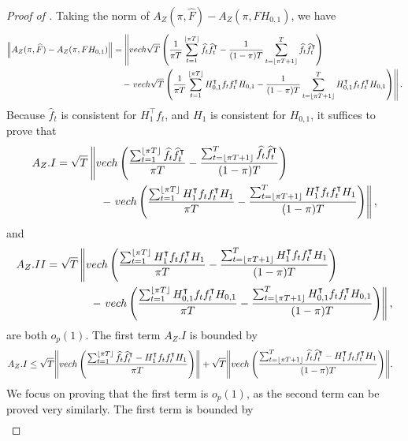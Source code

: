 \documentclass[12pt]{article}
\newcommand*{\tran}{\intercal}
\theoremstyle{plain}
\numberwithin{equation}{section}
\begin{document}
\begin{proof}[Proof of ]
Taking the norm of $A_Z(\pi, \widehat{F}) - A_Z(\pi, F H_{0, 1})$, we have
\begin{align*}
\norm{A_Z(\pi, \widehat{F}) - A_Z(\pi, F H_{0, 1})}
&= 
\left\lVert vech \sqrt{T} \left( 
\frac{1}{\pi T} \sumTfloor \widehat{f}_t \widehat{f}_t^\tran -
\frac{1}{(1 - \pi)T} \sumTfloort \widehat{f}_t \widehat{f}_t^\tran
\right) \right. \\
&\quad - \left. vech \sqrt{T} \left( 
\frac{1}{\pi T} \sumTfloor H_{0, 1}^\tran f_t f_t^{\tran} H_{0, 1} -
\frac{1}{(1 - \pi)T} \sumTfloort H_{0, 1}^\tran f_t f_t^{\tran} H_{0, 1}
\right)
\right\rVert .
\end{align*}
Because $\widehat{f}_t$ is consistent for $H_1^\tran f_t$, and $H_1$ is consistent for $H_{0, 1}$, it suffices to prove that
\begin{align*}
A_Z.I &=
\sqrt{T} \left\lVert
vech \left( 
\frac{\sumTfloor \widehat{f}_t \widehat{f}_t^\tran}{\pi T} - 
\frac{\sumTfloort \widehat{f}_t \widehat{f}_t^\tran}{(1 - \pi)T}
\right) \right. \\ 
&\quad \quad \quad \quad - \left. 
vech \left( 
\frac{\sumTfloor H_{1}^\tran f_t f_t^{\tran} H_{1}}{\pi T} - 
\frac{\sumTfloort H_{1}^\tran f_t f_t^{\tran} H_{1}}{(1 - \pi)T}
\right)  
\right\rVert,
\end{align*}
and
\begin{align*}
A_Z.II &= 
\sqrt{T} \left\lVert
vech \left( 
\frac{\sumTfloor H_{1}^\tran f_t f_t^{\tran} H_{1}}{\pi T} - 
\frac{\sumTfloort H_{1}^\tran f_t f_t^{\tran} H_{1}}{(1 - \pi)T}
\right) \right. \\
&\quad \quad \quad \quad - \left.  
vech \left( 
\frac{\sumTfloor H_{0, 1}^\tran f_t f_t^{\tran} H_{0, 1}}{\pi T} - 
\frac{\sumTfloort H_{0, 1}^\tran f_t f_t^{\tran} H_{0, 1}}{(1 - \pi)T} \right) 
\right\rVert,
\end{align*}
are both $o_p(1)$. The first term $A_Z.I$ is bounded by 
\begin{align*}
A_Z.I 
&\leq 
\sqrt{T}\norm{
vech \left( 
\frac{\sumTfloor \widehat{f}_t \widehat{f}_t^\tran - H_{1}^\tran f_t f_t^{ \tran} H_{1}}{\pi T}
\right)}
+ \sqrt{T}\norm{
vech \left( 
\frac{\sumTfloort \widehat{f}_t \widehat{f}_t^\tran - H_{1}^\tran f_t f_t^{ \tran} H_{1}}{(1 - \pi)T}
\right)
}.
\end{align*}
We focus on proving that the first term is $o_p(1)$, as the second term can be proved very similarly. The first term is bounded by
\begin{align*}

\end{align*}
\end{proof}
\end{document}
